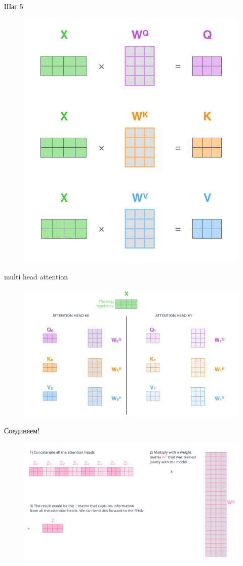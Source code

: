 \documentclass[notes,12pt, aspectratio=169]{beamer}
\begin{document}
\begin{frame}{Шаг 5}
\begin{figure}
	\centering
	\includegraphics[width=0.4\linewidth]{images/step_5}
	\label{fig:seq2seq}
\end{figure}
\end{frame}

\begin{frame}{multi head attention}
\begin{figure}
	\centering
	\includegraphics[width=0.8\linewidth]{images/multi_heads}
	\label{fig:seq2seq}
\end{figure}
\end{frame}

\begin{frame}{Соединяем!}
\begin{figure}
	\centering
	\includegraphics[width=0.8\linewidth]{images/transformer_attention_heads_weight_matrix_o}
	\label{fig:seq2seq}
\end{figure}
\end{frame}
\end{document}
